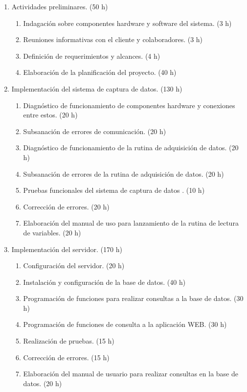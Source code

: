 \documentclass[
11pt, %
codirector, %
]{charter}
\begin{document}
\begin{enumerate}

\item Actividades preliminares. (50 h)
	\begin{enumerate}
	\item Indagación sobre componentes hardware y software del sistema. (3 h)
	\item Reuniones informativas con el cliente y colaboradores. (3 h)
	\item Definición de requerimientos y alcances. (4 h)
	\item Elaboración de la planificación del proyecto. (40 h)
	\end{enumerate}
\item Implementación del sistema de captura de datos. (130 h)
	\begin{enumerate}
	\item Diagnóstico de funcionamiento de componentes hardware y conexiones entre estos. (20 h)
	\item Subsanación de errores de comunicación. (20 h) 
	\item Diagnóstico de funcionamiento de la rutina de adquisición de datos. (20 h)
	\item Subsanación de errores de la rutina de adquisición de datos. (20 h)
	\item Pruebas funcionales del sistema de captura de datos . (10 h)
	\item Corrección de errores. (20 h)
	\item Elaboración del manual de uso para lanzamiento de la rutina de lectura de variables. (20 h)
	\end{enumerate}
\item Implementación del servidor. (170 h)
	\begin{enumerate}
	\item Configuración del servidor. (20 h)
	\item Instalación y configuración de la base de datos. (40 h)
	\item Programación de funciones para realizar consultas a la base de datos. (30 h)
	\item Programación de funciones de consulta a la aplicación WEB. (30 h)
	\item Realización de pruebas. (15 h)
	\item Corrección de errores. (15 h)
	\item Elaboración del manual de usuario para realizar consultas en la base de datos. (20 h)
	\end{enumerate}

\end{enumerate}
\end{document}
